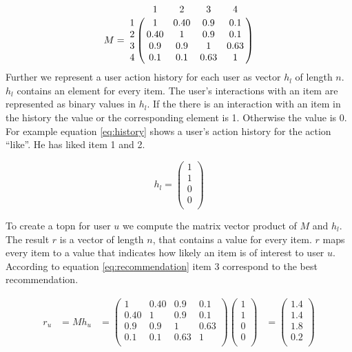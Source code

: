 \begin{equation}
  \label{eq:similaritymatrix}
M =\bordermatrix{~ & 1 & 2 & 3 & 4 \cr
 1 & 1  & 0.40 & 0.9 & 0.1 \cr
2 & 0.40 &1  & 0.9 & 0.1 \cr
 3& 0.9 & 0.9 &1  & 0.63 \cr
 4 & 0.1 & 0.1 & 0.63 &1  \cr}
\end{equation}
Further we represent a user action history for each user as vector $h_l$ of length $n$. $h_l$ contains an element for every item. The user's interactions with an item are represented as binary values in $h_l$. If the there is an interaction with an item in the history the value or the corresponding element is 1. Otherwise the value is 0. For example equation \ref{eq:history} shows a user's action history for the action ``like''. He has liked item 1 and 2.

\begin{equation}
\label{eq:history}
h_l =
\begin{pmatrix}
 1 \\
 1 \\
 0 \\
 0 \\
\end{pmatrix}
\end{equation}

To create a \gls{topn} for user $u$ we compute the matrix vector product of $M$ and $h_l$. The result $r$ is a vector of length $n$, that contains a value for every item. $r$ maps every item to a value that indicates how likely an item is of interest to user $u$. According to equation \ref{eq:recommendation} item 3 correspond to the best recommendation.

\begin{align}
  \label{eq:recommendation}
r_u &= M h_u 
&=
\begin{pmatrix}
  1  & 0.40 & 0.9 & 0.1 \\
 0.40 &1  & 0.9 & 0.1 \\
  0.9 & 0.9 &1  & 0.63 \\
  0.1 & 0.1 & 0.63 &1 \\  
\end{pmatrix} 
\begin{pmatrix}
 1 \\
 1 \\
 0 \\
 0 \\
\end{pmatrix}
&= 
\begin{pmatrix}
 1.4 \\
 1.4 \\
 1.8 \\
 0.2 \\
\end{pmatrix}
\end{align}


